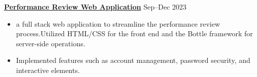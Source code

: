 \textbf{\href{https://github.com/tanjet/performance-review}{Performance Review Web Application}} \hfill Sep--Dec 2023 \par
\begin{itemize}
	\item a full stack web application to streamline the performance review process.Utilized HTML/CSS for the front end and the Bottle framework for server-side operations.
	\item Implemented features such as account management, password security, and interactive elements.
\end{itemize}\vspace{0.1cm} \par